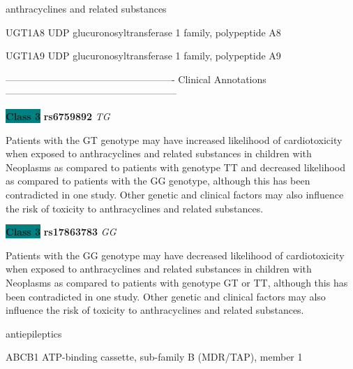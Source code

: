 \documentclass{resume} %
\begin{document}
\begin{rSection}{ anthracyclines and related substances }
\begin{rSubsection}{ UGT1A8 }{ UDP glucuronosyltransferase 1 family, polypeptide A8 }{}{}
\end{rSubsection}\begin{rSubsection}{ UGT1A9 }{ UDP glucuronosyltransferase 1 family, polypeptide A9 }{}{}
\item[]

\item[] ---------------------------------------------------- Clinical Annotations -----------------------------------------------------\newline
\item \textbf{\colorbox{teal} {Class 3}} \textbf{ rs6759892 } \textit{ TG }
\item[] Patients with the GT genotype may have increased likelihood of cardiotoxicity when exposed to anthracyclines and related substances in children with Neoplasms as compared to patients with genotype TT and decreased likelihood as compared to patients with the GG genotype, although this has been contradicted in one study. Other genetic and clinical factors may also influence the risk of toxicity to anthracyclines and related substances. \item \textbf{\colorbox{teal} {Class 3}} \textbf{ rs17863783 } \textit{ GG }
\item[] Patients with the GG genotype may have decreased likelihood of cardiotoxicity when exposed to anthracyclines and related substances in children with Neoplasms as compared to patients with genotype GT or TT, although this has been contradicted in one study. Other genetic and clinical factors may also influence the risk of toxicity to anthracyclines and related substances.

\end{rSubsection}

\end{rSection}\begin{rSection}{ antiepileptics }
\item[]

\begin{rSubsection}{ ABCB1 }{ ATP-binding cassette, sub-family B (MDR/TAP), member 1 }{}{}
\item[]


\end{rSubsection}
\end{rSection}
\end{document}
